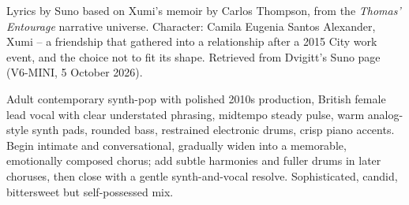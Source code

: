 
\begin{notes}
Lyrics by Suno based on Xumi's memoir by Carlos Thompson, from the \emph{Thomas’ Entourage} narrative universe. Character: Camila Eugenia Santos Alexander, Xumi -- a friendship that gathered into a relationship after a 2015 City work event, and the choice not to fit its shape. Retrieved from Dvigitt's Suno page (V6-MINI, 5 October 2026).
\end{notes}
\begin{style}
Adult contemporary synth-pop with polished 2010s production, British female lead vocal with clear understated phrasing, midtempo steady pulse, warm analog-style synth pads, rounded bass, restrained electronic drums, crisp piano accents. Begin intimate and conversational, gradually widen into a memorable, emotionally composed chorus; add subtle harmonies and fuller drums in later choruses, then close with a gentle synth-and-vocal resolve. Sophisticated, candid, bittersweet but self-possessed mix.
\end{style}
